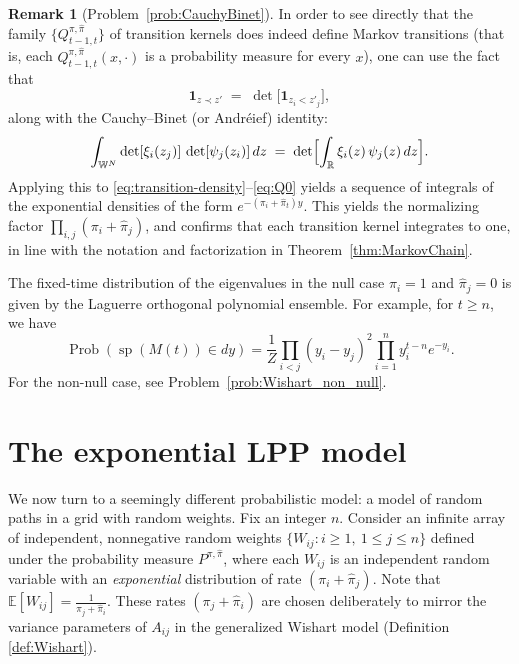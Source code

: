 \documentclass[letterpaper,11pt,oneside,reqno]{article}
\numberwithin{equation}{section}
\theoremstyle{definition}
\newtheorem{remark}[proposition]{Remark}
\begin{document}
\begin{remark}[Problem~\ref{prob:CauchyBinet}]
\label{rem:CauchyBinet}
In order to see directly that the family $\bigl\{Q^{\pi,\hat{\pi}}_{t-1,t}\bigr\}$ of transition kernels does indeed define Markov transitions (that is, each $Q^{\pi,\hat{\pi}}_{t-1,t}(x,\cdot)$ is a probability measure for every $x$), one can use the fact that
\[
	\mathbf{1}_{z \prec z'}
\;=\;
\det\bigl[\mathbf{1}_{z_i < z'_j}\bigr],
\]
along with the Cauchy--Binet (or Andr\'eief) identity:
\[
\int_{\mathbb{W}^N}
\det[\xi_i(z_j)]\,
\det[\psi_j(z_i)]
\,dz
\;=\;
\det\Bigl[
\int_{\mathbb{R}}
\xi_i(z)\,\psi_j(z)\,dz
\Bigr].
\]
Applying this to
\eqref{eq:transition-density}--\eqref{eq:Q0}
yields a sequence of integrals 
of the exponential densities
of the form $e^{-(\pi_i+\hat \pi_t)y}$.
This yields the normalizing factor
$\prod_{i,j}(\pi_i+\hat \pi_j)$,
and confirms
that each transition kernel
integrates to one, in line with the notation and
factorization in Theorem~\ref{thm:MarkovChain}.
\end{remark}

The fixed-time distribution of the eigenvalues
in the null case $\pi_i=1$ and $\hat\pi_j=0$ is
given by the Laguerre orthogonal polynomial ensemble. For example, for $t\ge n$, we have
\begin{equation}
	\label{eq:Laguerre}
	\operatorname{Prob}(\operatorname{sp}(M(t))\in dy)
	=
	\frac{1}{Z}\prod_{i<j}(y_i-y_j)^2
	\prod_{i=1}^n y_i^{t-n} e^{-y_i}.
\end{equation}
For the non-null case, see Problem~\ref{prob:Wishart_non_null}.

\section{The exponential LPP model}

We now turn to a seemingly different probabilistic model: a
model of random paths in a grid with random weights. Fix an
integer $n$. Consider an infinite array of independent,
nonnegative random weights $\{W_{ij}: i\ge 1,\ 1\le j\le n\}$ defined under the probability measure $P^{\pi,\hat\pi}$,
where each $W_{ij}$ is an independent random variable with
an \emph{exponential} distribution of rate $(\pi_i +
\hat\pi_j)$.
Note that $\mathbb{E}[W_{ij}] = \frac{1}{\pi_j+\hat\pi_i}$.
These rates $(\pi_j+\hat\pi_i)$ are chosen deliberately to
mirror the variance parameters of $A_{ij}$ in the
generalized Wishart model (Definition \ref{def:Wishart}).
\end{document}

